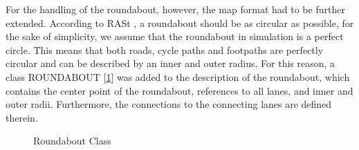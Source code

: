 \documentclass[11pt,oneside,openright]{mpreport}
\begin{document}
For the handling of the roundabout, however, the map format had to be further extended. According to RASt \cite{rast06}, a roundabout should be as circular as possible, 
for the sake of simplicity, we assume that the roundabout in simulation is a perfect circle. This means that both roads,
cycle paths and footpaths are perfectly circular and can be described by an inner and outer radius. For this reason, a class ROUNDABOUT [\cref{roundabout_class}] was added to the description of the roundabout,
which contains the center point of the roundabout, references to all lanes, and inner and outer radii. Furthermore, the connections to the connecting lanes are defined therein.

\begin{figure}[!ht]
\begin{center}
\caption{Roundabout Class}
\label{roundabout_class}
\end{center}
\end{figure}
\end{document}

